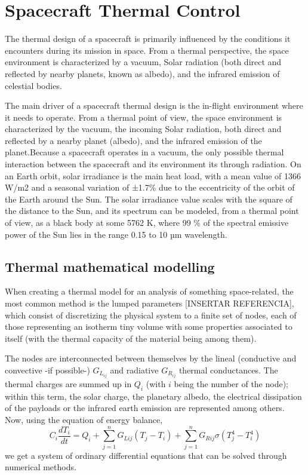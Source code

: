 \section{Spacecraft Thermal Control}

The thermal design of a spacecraft is primarily influenced by the conditions it encounters during its mission in space. From a thermal perspective, the space environment is characterized by a vacuum, Solar radiation (both direct and reflected by nearby planets, known as albedo), and the infrared emission of celestial bodies.

The main driver of a spacecraft thermal design is the in-flight environment where it needs to operate. From a thermal point of view, the space environment is characterized by the vacuum, the incoming Solar radiation, both direct and reflected by a nearby planet (albedo), and the infrared
emission of the planet.Because a spacecraft operates in a vacuum, the only possible thermal interaction between the spacecraft and its environment its through radiation. On an Earth orbit, solar irradiance is the main heat load, with a mean value of 1366 W/m2 and a seasonal variation of ±1.7\% due to the eccentricity of the orbit of the Earth around the Sun. The solar irradiance value scales with the square of the distance to the Sun, and its spectrum can be modeled, from a thermal point of view, as a black body at some 5762 K, where 99 \% of the spectral emissive power of the Sun lies in the range 0.15 to 10 µm wavelength.

\subsection{Thermal mathematical modelling}
When creating a thermal model for an analysis of something space-related, the most common method is the lumped parameters [INSERTAR REFERENCIA], which consist of discretizing the physical system to a finite set of nodes, each of those representing an isotherm tiny volume with some properties associated to itself (with the thermal capacity of the material being among them). 

The nodes are interconnected between themselves by the lineal (conductive and convective -if possible-) $G_{L_{ij}}$ and radiative $G_{R_{ij}}$ thermal conductances. The thermal charges are summed up in $Q_i$ (with $i$ being the number of the node); within this term, the solar charge, the planetary albedo, the electrical dissipation of the payloads or the infrared earth emission are represented among others. Now, using the equation of energy balance,
\begin{equation}C_i\frac{dT_i}{dt}=Q_i+\sum_{j=1}^nG_{Lij}\left(T_j-T_i\right)+\sum_{j=1}^nG_{Rij}\sigma\left(T_j^4-T_i^4\right)\end{equation}
we get a system of ordinary differential equations that can be solved through numerical methods.

